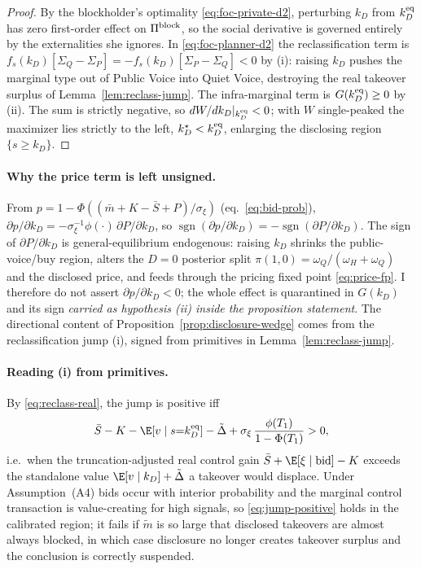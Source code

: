 \begin{proof}
By the blockholder's optimality \eqref{eq:foc-private-d2}, perturbing $k_D$ from
$k_D^{\textup{eq}}$ has zero first-order effect on $\Pi^{\textup{block}}$, so the
social derivative is governed entirely by the externalities she ignores. In
\eqref{eq:foc-planner-d2} the reclassification term is
$f_s(k_D)[\Sigma_Q-\Sigma_P]=-f_s(k_D)[\Sigma_P-\Sigma_Q]<0$ by (i): raising
$k_D$ pushes the marginal type out of Public Voice into Quiet Voice, destroying
the real takeover surplus of Lemma~\ref{lem:reclass-jump}. The infra-marginal term
is $G(k_D^{\textup{eq}})\ge0$ by (ii). The sum is strictly negative, so
$dW/dk_D|_{k_D^{\textup{eq}}}<0$; with $W$ single-peaked the maximizer lies
strictly to the left, $k_D^{\star}<k_D^{\textup{eq}}$, enlarging the disclosing
region $\{s\ge k_D\}$.
\end{proof}

\paragraph{Why the price term is left unsigned.}
From $p=1-\Phi((\bar m+K-\bar S+P)/\sigma_\xi)$ (eq.~\eqref{eq:bid-prob}),
$\partial p/\partial k_D=-\sigma_\xi^{-1}\phi(\cdot)\,\partial P/\partial k_D$, so
$\operatorname{sgn}(\partial p/\partial k_D)=-\operatorname{sgn}(\partial P/
\partial k_D)$. The sign of $\partial P/\partial k_D$ is general-equilibrium
endogenous: raising $k_D$ shrinks the public-voice/buy region, alters the $D{=}0$
posterior split $\pi(1,0)=\omega_Q/(\omega_H+\omega_Q)$ and the disclosed price,
and feeds through the pricing fixed point \eqref{eq:price-fp}. I therefore do not
assert $\partial p/\partial k_D<0$; the whole effect is quarantined in $G(k_D)$
and its sign \emph{carried as hypothesis (ii) inside the proposition statement}.
The directional content of Proposition~\ref{prop:disclosure-wedge} comes from the
reclassification jump (i), signed from primitives in
Lemma~\ref{lem:reclass-jump}.

\paragraph{Reading (i) from primitives.}
By \eqref{eq:reclass-real}, the jump is positive iff
\begin{equation}
\bar S-K-\E[v\mid s{=}k_D^{\textup{eq}}]-\tilde\Delta
   +\sigma_\xi\,\frac{\phi(T_1)}{1-\Phi(T_1)}>0,
\label{eq:jump-positive}
\end{equation}
i.e.\ when the truncation-adjusted real control gain
$\bar S+\E[\xi\mid\text{bid}]-K$ exceeds the standalone value $\E[v\mid k_D]
+\tilde\Delta$ a takeover would displace. Under Assumption~\textup{(A4)} bids
occur with interior probability and the marginal control transaction is
value-creating for high signals, so \eqref{eq:jump-positive} holds in the
calibrated region; it fails if $\tilde m$ is so large that disclosed takeovers are
almost always blocked, in which case disclosure no longer creates takeover surplus
and the conclusion is correctly suspended.

